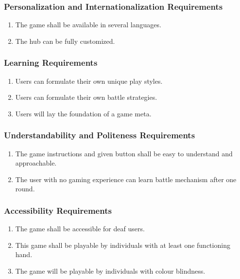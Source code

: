 \documentclass[]{article}
\begin{document}
\subsubsection{Personalization and Internationalization Requirements}
\label{ssub:personalization_and_internationalization_requirements}
\begin{enumerate}[{UH}1. ]
	\item The game shall be available in several languages.
	\item The hub can be fully customized.
\end{enumerate}

\subsubsection{Learning Requirements}
\label{ssub:learning_requirements}
\begin{enumerate}[{UH}1. ]
	\item Users can formulate their own unique play styles.
	\item Users can formulate their own battle strategies.
	\item Users will lay the foundation of a game meta.
\end{enumerate}

\subsubsection{Understandability and Politeness Requirements}
\label{ssub:understandability_and_politeness_requirements}
\begin{enumerate}[{UH}1. ]
    \item The game instructions and given button shall be easy to understand and approachable.
	\item The user with no gaming experience can learn battle mechanism after one round.
	
\end{enumerate}

\subsubsection{Accessibility Requirements}
\label{ssub:accessibility_requirements}
\begin{enumerate}[{UH}1. ]
	\item The game shall be accessible for deaf users.
	\item This game shall be playable by individuals with at least one functioning hand.
	\item The game will be playable by individuals with colour blindness.
\end{enumerate}
\end{document}
